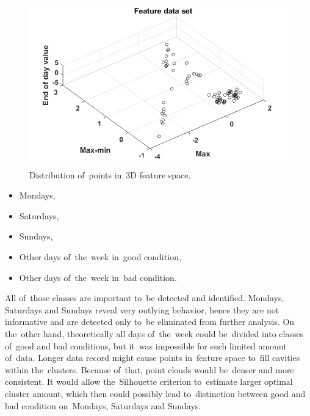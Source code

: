 \begin{figure}[ht!]
\centering
\includegraphics[width = \textwidth]{wykresy/unclusteredbw.png}
\caption{Distribution of~points in~3D feature space.}
\label{fig: unclusteredbw}
\end{figure}

\begin{itemize}
\renewcommand{\labelitemi}{$\bullet$}
\item Mondays,
\item Saturdays,
\item Sundays,
\item Other days of~the~week in~good condition,
\item Other days of~the~week in~bad condition.
\end{itemize}

All of~those classes are important to~be detected and identified. Mondays, Saturdays and Sundays reveal very outlying behavior, hence they are not informative and are detected only to~be eliminated from further analysis. On the~other hand, theoretically all days of~the~week could be~divided into classes of~good and bad conditions, but it~was impossible for such limited amount of~data. Longer data record might cause points in~feature space to~fill cavities within the~clusters. Because of~that, point clouds would be~denser and more consistent. It would allow the~Silhouette criterion to~estimate larger optimal cluster amount, which then could possibly lead to~distinction between good and bad condition on~Mondays, Saturdays and Sundays.

